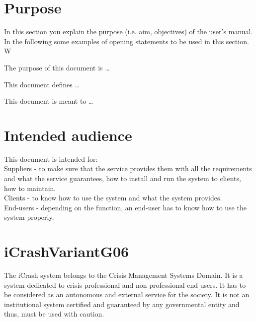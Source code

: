 



\section{Purpose}
In this section you explain the purpose (i.e. aim, objectives) of the user's
manual. In the following some examples of opening statements to be used in this
section. W  

The purpose of this document is \ldots

This document defines \ldots

This document is meant to \ldots



\section{Intended audience}

This document is intended for:\\
Suppliers - to make sure that the service provides them with all the
requirements and what the service guarantees, how to install and run the system to clients,
how to maintain. \\
Clients  - to know how to use the system and what the system provides. \\
End-users - depending on the function, an end-user has to know how to use the
system properly.\\


\section{iCrashVariantG06}
The iCrash system belongs to the Crisis Management Systems Domain. It is a
system dedicated to crisis professional and non professional end users. It has
to be considered as an autonomous and external service for the society. It is not an institutional system certified and guaranteed by any governmental entity and thus, must be used with caution.\\
 

